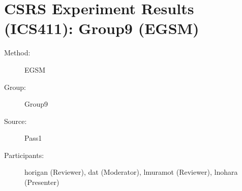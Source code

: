 \chapter {CSRS Experiment Results (ICS411): Group9 (EGSM)}
\small
	  

\begin{description}
\item [Method:] EGSM
\item [Group:] Group9
\item [Source:] Pass1
\item [Participants:] horigan (Reviewer), dat (Moderator), lmuramot (Reviewer), lnohara (Presenter)
\end{description}

